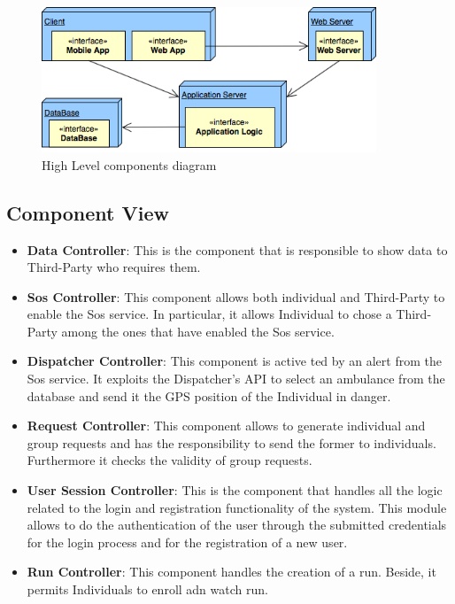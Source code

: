 \documentclass[a4paper]{article}
\begin{document}
\begin{figure}[!htpb]
    	\centering
    	\includegraphics[width=100mm,keepaspectratio]{images/highlevel2.png}
    	\caption{High Level components diagram}
\end{figure}

\subsection{Component View}


\begin{itemize}
    \item \textbf{Data Controller}: 
    This is the component that is responsible to show data to Third-Party who requires them.
    
    \item \textbf{Sos Controller}: This component allows both individual and Third-Party to enable the Sos service. In particular, it allows Individual to chose a Third-Party among the ones that have enabled the Sos service.
    
    \item \textbf{Dispatcher Controller}: This component is active ted by an alert from the Sos service. It exploits the Dispatcher's API to select an ambulance from the database and send it the GPS position of the Individual in danger.
    
    \item \textbf{Request Controller}:
    This component allows to generate individual and group requests and has the responsibility to send the former to individuals. Furthermore it checks the validity of group requests.
    
    \item \textbf{User Session Controller}: This is the component that handles all the logic related to the login and
registration functionality of the system. This module allows to do the authentication of the user through the submitted
credentials for the login process and for the registration of a new user.
    
    \item \textbf{Run Controller}: This component handles the creation of a run. Beside, it permits Individuals to enroll adn watch run.

    
\end{itemize}
\end{document}
